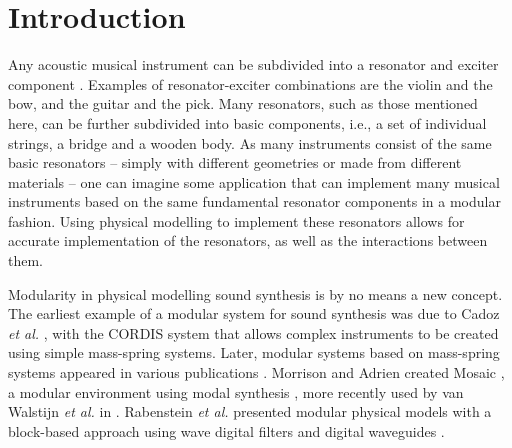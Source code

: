 \documentclass{article}
\title{\papertitle}
\begin{document}
%
\capstartfalse
\maketitle
\capstarttrue
%
\begin{abstract}
Through recent advances in processing power, physical modelling using finite-difference time-domain (FDTD) methods has gained popularity. Many different musical instrument models based on these methods exist, and nearly all are based on the same underlying systems and interactions between them. This paper presents an application where individual resonator modules, such as strings, bars, membranes and plates, can be connected in a modular fashion and interacted with in real time. Various excitations, including the bow, hammer and pluck, are implemented as well, allowing for expressive control and a wide sonic palette. Existing and non-existing model configurations can easily be implemented, modified and experimented with, as well as the parameters describing them.
\end{abstract}
%

\section{Introduction}\label{sec:introduction}
Any acoustic musical instrument can be subdivided into a resonator and exciter component \cite{Borin1989}. Examples of resonator-exciter combinations are the violin and the bow, and the guitar and the pick. Many resonators, such as those mentioned here, can be further subdivided into basic components, i.e., a set of individual strings, a bridge and a wooden body. As many instruments consist of the same basic resonators -- simply with different geometries or made from different materials -- one can imagine some application that can implement many musical instruments based on the same fundamental resonator components in a modular fashion. Using physical modelling to implement these resonators allows for accurate implementation of the resonators, as well as the interactions between them.  

Modularity in physical modelling sound synthesis is by no means a new concept. The earliest example of a modular system for sound synthesis was due to Cadoz \textit{et al.} \cite{Cadoz1983}, with the CORDIS system that allows complex instruments to be created using simple mass-spring systems. Later, modular systems based on mass-spring systems appeared in various publications \cite{Castagne2002, Berdahl2012, Leonard2019}. Morrison and Adrien created Mosaic \cite{Morrison1993}, a modular environment using modal synthesis \cite{Adrien1991}, more recently used by van Walstijn \textit{et al.} in \cite{Walstijn2017}. Rabenstein \textit{et al.} presented modular physical models with a block-based approach using wave digital filters \cite{Rabenstein2007} and digital waveguides \cite{Smith1992}. 
\end{document}

